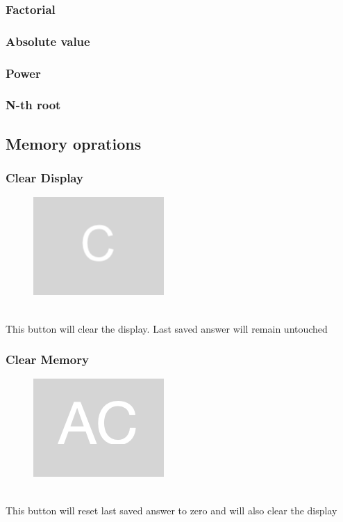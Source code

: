 \documentclass[11pt, a4paper]{article}
\theoremstyle{definition}
\begin{document}
    \subsubsection{Factorial}

    \subsubsection{Absolute value}

    \subsubsection{Power}

    \subsubsection{N-th root}

    \newpage

    \subsection{Memory oprations}

    \subsubsection{Clear Display }

    \begin{figure}[h]
        \includegraphics[scale = 0.2]{clear_display}
        \centering
        \label{fig:ac}
    \end{figure}
    \\
    This button will clear the display. Last saved answer will remain untouched

    \subsubsection{Clear Memory}

    \begin{figure}[h]
        \includegraphics[scale = 0.2]{clear_memory}
        \centering
        \label{fig:c}
    \end{figure}
    \\
    This button will reset last saved answer to zero and will also clear the display
\end{document}
